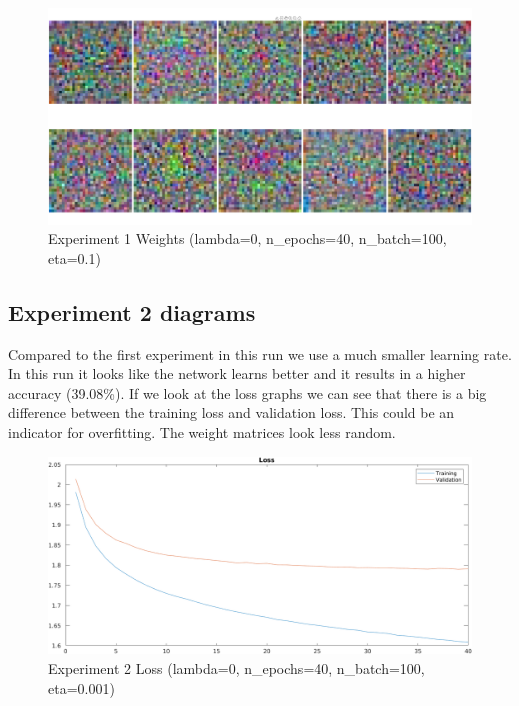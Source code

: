     \begin{figure}[ht]
        \includegraphics[width=\textwidth]{../code/result_pics/lambda=0, n_epochs=40, n_batch=100, eta=.1/weights.png}
        \caption{Experiment 1 Weights (lambda=0, n\_epochs=40, n\_batch=100, eta=0.1)}
        \label{fig:weights1}
    \end{figure}

\clearpage
\subsection{Experiment 2 diagrams}
Compared to the first experiment in this run we use a much smaller learning rate. In this run it looks like the network learns better and it results in a higher
accuracy (39.08\%). If we look at the loss graphs we can see that there is a big difference between the training loss and validation loss. 
This could be an indicator for overfitting. The weight matrices look less random.

    \begin{figure}[ht]
        \includegraphics[width=\textwidth]{../code/result_pics/lambda=0, n_epochs=40, n_batch=100, eta=.001/loss.png}
        \caption{Experiment 2 Loss (lambda=0, n\_epochs=40, n\_batch=100, eta=0.001)}
        \label{fig:loss2}
    \end{figure}

